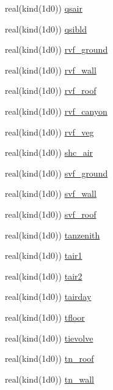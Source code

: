 \begin{DoxyCompactItemize}
\item 
real(kind(1d0)) \hyperlink{namespaceestm__data_ae795d432550126e53ae2b5d23aa201ee}{qsair}
\item 
real(kind(1d0)) \hyperlink{namespaceestm__data_a8ff592c60b4e732443fd36c877a550bf}{qsibld}
\item 
real(kind(1d0)) \hyperlink{namespaceestm__data_a92e6dde87beb4b135989c014c954724d}{rvf\+\_\+ground}
\item 
real(kind(1d0)) \hyperlink{namespaceestm__data_afe15d5484c54bc270928313b67cd282f}{rvf\+\_\+wall}
\item 
real(kind(1d0)) \hyperlink{namespaceestm__data_a3501ea07273d6456cdc4fedd9b771d6d}{rvf\+\_\+roof}
\item 
real(kind(1d0)) \hyperlink{namespaceestm__data_aee07cb5c857d8a1e88758c8917f30a9d}{rvf\+\_\+canyon}
\item 
real(kind(1d0)) \hyperlink{namespaceestm__data_ab7bfb1808a01900faec78277f5baab8e}{rvf\+\_\+veg}
\item 
real(kind(1d0)) \hyperlink{namespaceestm__data_a7a061270d21a36b76485b8f10b9e2180}{shc\+\_\+air}
\item 
real(kind(1d0)) \hyperlink{namespaceestm__data_afd27c2534f1d97d23367fc2b4203e4f7}{svf\+\_\+ground}
\item 
real(kind(1d0)) \hyperlink{namespaceestm__data_ac1d0eaab6bd3fd1a3a65ad825490f404}{svf\+\_\+wall}
\item 
real(kind(1d0)) \hyperlink{namespaceestm__data_ae568b13ec9ad1aad863dfe2b54d4d695}{svf\+\_\+roof}
\item 
real(kind(1d0)) \hyperlink{namespaceestm__data_a6f163e79efdc616eef7a91dee109f9a0}{tanzenith}
\item 
real(kind(1d0)) \hyperlink{namespaceestm__data_a48baf6ba495e6fa5d691bb962487261e}{tair1}
\item 
real(kind(1d0)) \hyperlink{namespaceestm__data_abcdcb259b4b85afcdb4ff0adb03940ca}{tair2}
\item 
real(kind(1d0)) \hyperlink{namespaceestm__data_a7c4bbc32ea4b8646912a7418623e1522}{tairday}
\item 
real(kind(1d0)) \hyperlink{namespaceestm__data_aa876704e968921da60f59a48ed4b1280}{tfloor}
\item 
real(kind(1d0)) \hyperlink{namespaceestm__data_a687144263fbc75d151299c74dba252b9}{tievolve}
\item 
real(kind(1d0)) \hyperlink{namespaceestm__data_a50154a0f89e449784f754f7109a400a6}{tn\+\_\+roof}
\item 
real(kind(1d0)) \hyperlink{namespaceestm__data_a5a5ae17df9fbcfc4b4d7ce3510cff799}{tn\+\_\+wall}

\end{DoxyCompactItemize}
